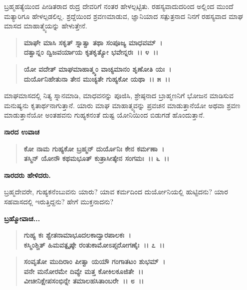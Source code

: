 ಬ್ರಹ್ಮಹತ್ಯೆಯಿಂದ ಪೀಡಿತರಾದ ರುದ್ರ ದೇವರಿಗೆ ನಂತರ ಹೇಳಲ್ಪಟ್ಟಿತು. ರಹಸ್ಯವಾದುದರಿಂದ ಅಲ್ಲಿಂದ ಮುಂದೆ ಮತ್ಯಾರಿಗೂ ಹೇಳಲ್ಪಡಲಿಲ್ಲ. ಶ್ರದ್ದೆಯಿಂದ ಶ್ರವಣಮಾಡುವ, ಜ್ಞಾನಿಯಾದ ಸತ್ಪುತ್ರನಾದ ನಿನಗೆ ರಹಸ್ಯವಾದ ಮಾಘ ಮಾಸದ ಮಾಹಾತ್ಮ್ಯೆಯನ್ನು ಹೇಳುತ್ತೇನೆ.

\begin{verse}
\textbf{ಮಾಘೇ ಮಾಸಿ ಸಕೃತ್ ಸ್ನಾತ್ವಾ ತಥಾ ಸಂಪೂಜ್ಯ ಮಾಧವಮ್~।}\\\textbf{ದತ್ವಾನ್ನಂ ದ್ವಿಜವರ್ಯಾಯ ಕೃತಕೃತ್ಯೋ ಭವೇನ್ನರಃ~।। ೪~।। }
\end{verse}

\begin{verse}
\textbf{ಯೋ ವದೇತ್ ಮಾಘಮಾಹಾತ್ಮ್ಯಂ ವಾಚ್ಯಮಾನಂ ಶೃಣೋತಿ ಯಃ~।}\\\textbf{ದುರ್ಯೊನಿಹೇತುನಾ ತೇನ ಮುಚ್ಯತೇ ಗುಹ್ಯಕೋ ಯಥಾ~।। ೫~।।}
\end{verse}

ಮಾಘಮಾಸದಲ್ಲಿ ನಿತ್ಯ ಸ್ನಾನಮಾಡಿ, ಮಾಧವನನ್ನು ಪೂಜಿಸಿ, ಶ್ರೇಷ್ಠನಾದ ಬ್ರಾಹ್ಮಣನಿಗೆ ಭೋಜನ ಮಾಡಿಸುವ ಮನುಷ್ಯನು ಕೃತಾರ್ಥನಾಗುತ್ತಾನೆ. ಯಾರು ಮಾಘ ಮಾಹಾತ್ಮ್ಯವನ್ನು ಪ್ರವಚನ ಮಾಡುತ್ತಾನೆಯೋ ಅಥವಾ ಶ್ರವಣ ಮಾಡುತ್ತಾನೆಯೋ ಅಂತಹವನು ಗುಹ್ಯಕನಂತೆ ದುಷ್ಟ ಯೋನಿಯಿಂದ ಬಿಡುಗಡೆ ಹೊಂದುತ್ತಾನೆ.

\begin{flushleft}
\textbf{ನಾರದ ಉವಾಚ\enginline{-}}
\end{flushleft}

\begin{verse}
\textbf{ಕೋ ನಾಮ ಗುಹ್ಯಕೋ ಬ್ರಹ್ಮನ್ ದುರ್ಯೊನಿಃ ಕೇನ ಕರ್ಮಣಾ~।}\\\textbf{ತಸ್ಮಿನ್ ಯೋನೌ ಕಥಮಭೂತ್ ಕುತ್ರಾಸೀತ್ಕೇನ ಸಂಗಮಃ~।। ೬~।।}
\end{verse}

\begin{flushleft}
\textbf{ನಾರದರು ಹೇಳಿದರು.}
\end{flushleft}

ಬ್ರಹ್ಮದೇವರೇ, ಗುಹ್ಯಕನೆಂಬುವನು ಯಾರು? ಯಾವ ಕರ್ಮದಿಂದ ದುರ್ಯೋನಿಯಲ್ಲಿ ಹುಟ್ಟಿದನು? ಯಾರ ಸಹವಾಸದಲ್ಲಿ ಇರುತ್ತಿದ್ದನು? ಹೇಗೆ ಮುಕ್ತನಾದನು?

\begin{flushleft}
\textbf{ಬ್ರಹ್ಮೋವಾಚ...}
\end{flushleft}

\begin{verse}
\textbf{ಗುಹ್ಯ ಕಃ ಶ್ವೇತನಾಮಾಭೂದಲಕಾದ್ವಾರಪಾಲಕಃ~।}\\\textbf{ಕಸ್ಮಿಂಶ್ಚಿತ್ ಹಿಮವತ್ಪೃಷ್ಠೇ ರಂತುಕಾಮೋಽಪ್ಸರೋಗಣೈಃ~।। ೭~।। }
\end{verse}

\begin{verse}
\textbf{ಸಂವೃತೋ ಮುದಿರಾಂ ಪೀತ್ವಾ ಯಯೌ ಗಂಗಾತಟಂ ಶುಭಮ್~।}\\\textbf{ವನೇ ಮನೋರಮೇ ದಿವ್ಯೇ ಮತ್ತ ಕೋಕಿಲಕೂಜಿತೇ~।।}\\\textbf{ವೀಚೀನಿಕ್ಷೇಪಸಂಭಿನ್ನೇ ತಮಾಲಹಸಿತಾಂಬರೇ~।। ೮~।।}
\end{verse}

